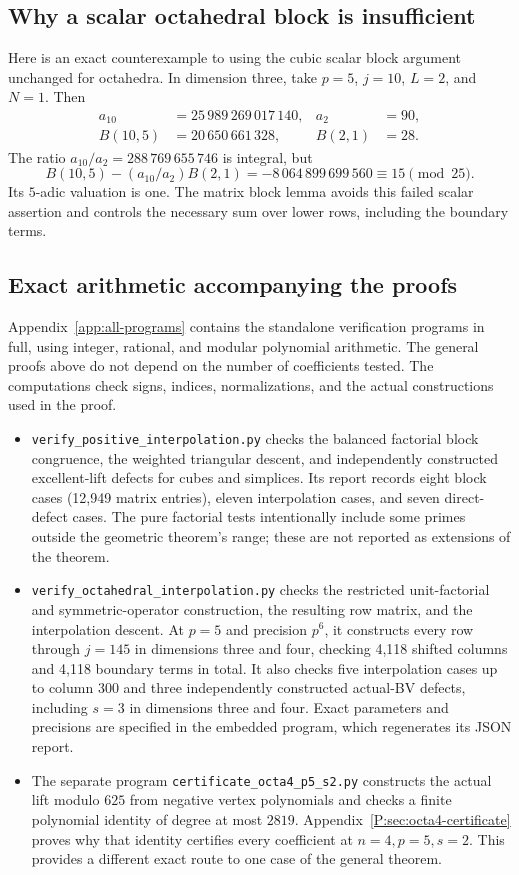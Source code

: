 \documentclass[11pt,a4paper]{article}
\theoremstyle{definition}\newtheorem{definition}[theorem]{Definition}
\theoremstyle{remark}\newtheorem{remark}[theorem]{Remark}
\numberwithin{equation}{section}
\begin{document}
\subsection{Why a scalar octahedral block is insufficient}

Here is an exact counterexample to using the cubic scalar block
argument unchanged for octahedra. In dimension three, take
$p=5$, $j=10$, $L=2$, and $N=1$. Then
\[
\begin{aligned}
 a_{10}&=25\,989\,269\,017\,140,& a_2&=90,\\
 B(10,5)&=20\,650\,661\,328,& B(2,1)&=28.
\end{aligned}
\]
The ratio $a_{10}/a_2=288\,769\,655\,746$ is integral, but
\[
 B(10,5)-(a_{10}/a_2)B(2,1)
 =-8\,064\,899\,699\,560\equiv15\pmod{25}.
\]
Its $5$-adic valuation is one. The matrix block lemma avoids
this failed scalar assertion and controls the necessary sum
over lower rows, including the boundary terms.

\subsection{Exact arithmetic accompanying the proofs}

Appendix~\ref{app:all-programs} contains the standalone verification programs in full, using integer, rational, and modular polynomial arithmetic.
The general proofs above do not depend on the number of
coefficients tested. The computations check signs, indices,
normalizations, and the actual constructions used in the proof.

\begin{itemize}
\item \texttt{verify\_positive\_interpolation.py} checks the
balanced factorial block congruence, the weighted triangular
descent, and independently constructed excellent-lift defects
for cubes and simplices. Its report records eight block cases
(12,949 matrix entries), eleven interpolation cases, and seven
direct-defect cases.
The pure factorial tests intentionally include some primes
outside the geometric theorem's range; these are not reported
as extensions of the theorem.
\item \texttt{verify\_octahedral\_interpolation.py} checks the restricted
unit-factorial and symmetric-operator construction, the resulting
row matrix, and the interpolation descent. At $p=5$ and precision
$p^6$, it constructs every row through $j=145$ in dimensions
three and four, checking 4,118 shifted columns and 4,118 boundary
terms in total. It also checks five interpolation cases up to
column 300 and three independently constructed actual-BV defects,
including $s=3$ in dimensions three and four. Exact parameters and precisions are specified in the embedded program, which regenerates its JSON report.
\item The separate program
\texttt{certificate\_octa4\_p5\_s2.py} constructs the actual
lift modulo $625$ from negative vertex polynomials and checks
a finite polynomial identity of degree at most $2819$.
Appendix~\ref{P:sec:octa4-certificate} proves why that identity
certifies every coefficient at $n=4,p=5,s=2$. This provides a
different exact route to one case of the general theorem.
\end{itemize}
\end{document}
